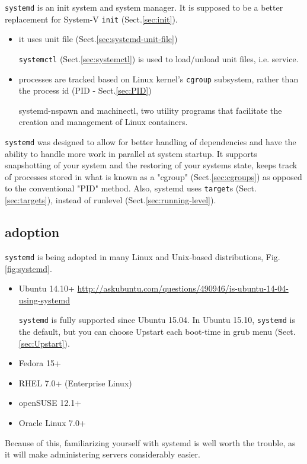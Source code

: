 \verb!systemd! is  an init system and system manager. It is supposed to be a
better replacement for System-V \verb!init! (Sect.\ref{sec:init}).
\begin{itemize}
  \item it uses unit file (Sect.\ref{sec:systemd-unit-file})

\verb!systemctl! (Sect.\ref{sec:systemctl}) is used to load/unload unit files,
i.e. service.

  \item processes are tracked based on Linux kernel's \verb!cgroup! subsystem,
  rather than the process id (PID - Sect.\ref{sec:PID})
  
systemd-nspawn and machinectl, two utility programs that facilitate the creation
and management of Linux containers.

\end{itemize}

\verb!systemd! was designed to allow for better handling of dependencies and
have the ability to handle more work in parallel at system startup.
It supports snapshotting of your system and the restoring of your systems state,
keeps track of processes stored in what is known as a "cgroup"
(Sect.\ref{sec:cgroups}) as opposed to the conventional "PID" method.
Also, systemd uses \verb!target!s (Sect.\ref{sec:targets}), instead of runlevel
(Sect.\ref{sec:running-level}).

\subsection{adoption}
\label{sec:systemd-adoption}

\verb!systemd! is being adopted in many Linux and Unix-based distributions,
Fig.\ref{fig:systemd}.
\begin{itemize}
  \item Ubuntu 14.10+
  \url{http://askubuntu.com/questions/490946/is-ubuntu-14-04-using-systemd}

\verb!systemd! is fully supported since Ubuntu 15.04.  In Ubuntu 15.10,
\verb!systemd! is the default, but you can choose Upstart each boot-time in grub
menu (Sect.\ref{sec:Upstart}).
  
  \item Fedora 15+
  
  \item RHEL 7.0+ (Enterprise Linux)
  
  \item openSUSE 12.1+
  
  \item Oracle Linux 7.0+
\end{itemize}
Because of this, familiarizing yourself with systemd is well worth the trouble,
as it will make administering servers considerably easier. 

